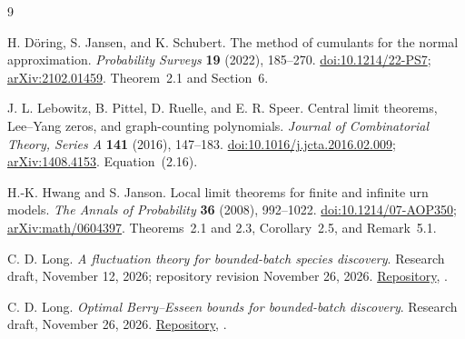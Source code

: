 \documentclass[11pt]{article}
\numberwithin{equation}{section}
\theoremstyle{remark}
\begin{document}
\begin{thebibliography}{9}

H. D\"oring, S. Jansen, and K. Schubert.
The method of cumulants for the normal approximation.
\emph{Probability Surveys} \textbf{19} (2022), 185--270.
\href{https://doi.org/10.1214/22-PS7}{doi:10.1214/22-PS7};
\href{https://arxiv.org/abs/2102.01459}{arXiv:2102.01459}.
Theorem~2.1 and Section~6.

J. L. Lebowitz, B. Pittel, D. Ruelle, and E. R. Speer.
Central limit theorems, Lee--Yang zeros, and graph-counting polynomials.
\emph{Journal of Combinatorial Theory, Series A} \textbf{141} (2016),
147--183.
\href{https://doi.org/10.1016/j.jcta.2016.02.009}{doi:10.1016/j.jcta.2016.02.009};
\href{https://arxiv.org/abs/1408.4153}{arXiv:1408.4153}.
Equation~(2.16).

H.-K. Hwang and S. Janson.
Local limit theorems for finite and infinite urn models.
\emph{The Annals of Probability} \textbf{36} (2008), 992--1022.
\href{https://doi.org/10.1214/07-AOP350}{doi:10.1214/07-AOP350};
\href{https://arxiv.org/abs/math/0604397}{arXiv:math/0604397}.
Theorems~2.1 and 2.3, Corollary~2.5, and Remark~5.1.

C. D. Long.
\emph{A fluctuation theory for bounded-batch species discovery}.
Research draft, November 12, 2026; repository revision November 26, 2026.
\href{https://github.com/long-mathematics/bounded-batch-discovery}{Repository},
.

C. D. Long.
\emph{Optimal Berry--Esseen bounds for bounded-batch discovery}.
Research draft, November 26, 2026.
\href{https://github.com/long-mathematics/bounded-batch-discovery}{Repository},
.

\end{thebibliography}
\end{document}
